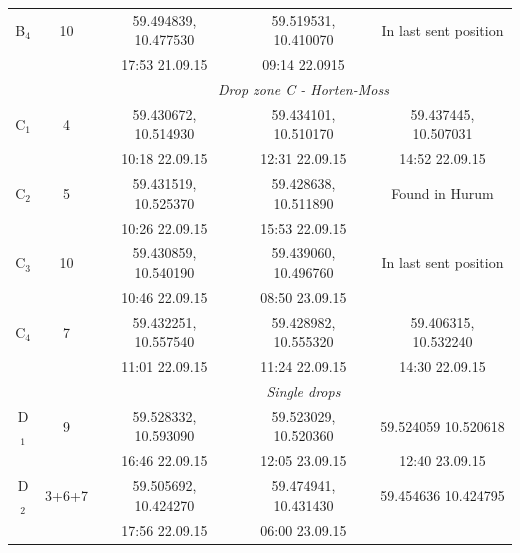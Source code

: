 \documentclass[12pt,a4paper,english]{article}
\begin{document}
\begin{table}[tb]
\begin{tabular}{|c|c|ccc|}
        B$_4$& 10      & 59.494839, 10.477530 & 59.519531, 10.410070    & In last sent position      \\
             &         & 17:53 21.09.15       & 09:14 22.0915           &                            \\ \hline 
             &         &          \multicolumn{3}{c|}{\textit{Drop zone C - Horten-Moss}}             \\
        C$_1$& 4       & 59.430672, 10.514930 & 59.434101, 10.510170    & 59.437445, 10.507031       \\
             &         & 10:18 22.09.15       & 12:31 22.09.15          & 14:52 22.09.15             \\
        C$_2$& 5       & 59.431519, 10.525370 & 59.428638, 10.511890    & Found in Hurum             \\
             &         & 10:26 22.09.15       & 15:53 22.09.15          &                            \\
        C$_3$& 10      & 59.430859, 10.540190 & 59.439060, 10.496760    & In last sent position      \\
             &         & 10:46 22.09.15	      & 08:50 23.09.15          &                            \\
        C$_4$& 7       & 59.432251, 10.557540 & 59.428982, 10.555320    & 59.406315, 10.532240       \\
             &         & 11:01 22.09.15       & 11:24 22.09.15          & 14:30 22.09.15             \\ \hline 
             &         &          \multicolumn{3}{c|}{\textit{Single drops}}                          \\
        D$_1$& 9       & 59.528332, 10.593090 & 59.523029, 10.520360    & 59.524059 10.520618        \\
             &         & 16:46 22.09.15       & 12:05 23.09.15          & 12:40 23.09.15             \\
        D$_2$& 3+6+7   & 59.505692, 10.424270 & 59.474941, 10.431430    & 59.454636 10.424795        \\
             &         & 17:56 22.09.15       & 06:00 23.09.15          &                            \\ 
\hline 
\end{tabular}
\end{table}
\clearpage
\end{document}
